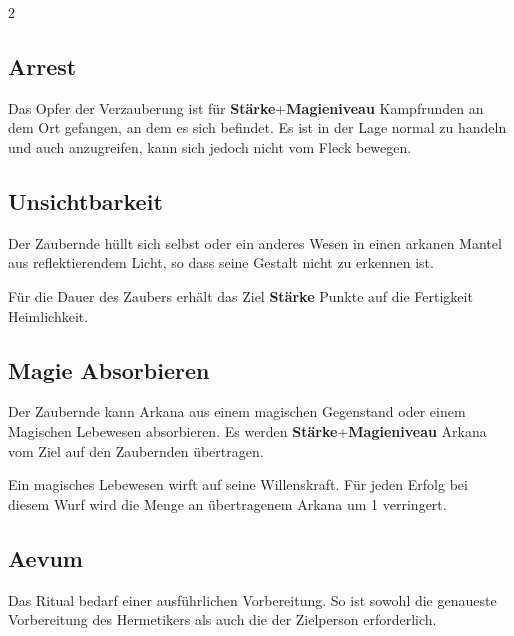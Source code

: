 \begin{multicols*}{2}


\subsection{Arrest}

Das Opfer der Verzauberung ist für \textbf{Stärke}+\textbf{Magieniveau} Kampfrunden an dem Ort gefangen, an dem es sich befindet. Es ist in der Lage normal zu handeln und auch anzugreifen, kann sich jedoch nicht vom Fleck bewegen.



\subsection{Unsichtbarkeit}

Der Zaubernde hüllt sich selbst oder ein anderes Wesen in einen arkanen Mantel aus reflektierendem Licht, so dass seine Gestalt nicht zu erkennen ist.

Für die Dauer des Zaubers erhält das Ziel \textbf{Stärke} Punkte auf die Fertigkeit Heimlichkeit.



\subsection{Magie Absorbieren}

Der Zaubernde kann Arkana aus einem magischen Gegenstand oder einem Magischen Lebewesen absorbieren. Es werden \textbf{Stärke}+\textbf{Magieniveau} Arkana vom Ziel auf den Zaubernden übertragen.

Ein magisches Lebewesen wirft auf seine Willenskraft. Für jeden Erfolg bei diesem Wurf wird die Menge an übertragenem Arkana um 1 verringert.



\subsection{Aevum}

Das Ritual bedarf einer ausführlichen Vorbereitung. So ist sowohl die genaueste Vorbereitung des Hermetikers als auch die der Zielperson erforderlich.


\end{multicols*}
